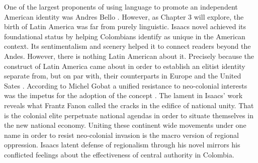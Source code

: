 \documentclass[12pt]{report}\usepackage[]{graphicx}\usepackage[]{color}
\begin{document}
\begin{spacing}{1.9}
One of the largest proponents of using language to promote an independent American identity was Andres Bello \autocite[1350]{Gobat2013}. However, as Chapter 3 will explore, the birth of Latin America was far from purely linguistic. Isaacs novel achieved its foundational status by helping Colombians identify as unique in the American context.  Its sentimentalism and scenery helped it to connect readers beyond the Andes. However, there is nothing Latin American about it. Precisely because the construct of Latin America came about in order to establish an elitist identity separate from, but on par with, their counterparts in Europe and the United Sates \autocite[1349]{Gobat2013}. According to Michel Gobat a unified resistance to neo-colonial interests was the impetus for the adoption of the concept \autocite[1349]{Gobat2013}. The lament in Isaacs' work reveals what Frantz Fanon called the cracks in the edifice of national unity. That is the colonial elite perpetuate national agendas in order to situate themselves in the new national economy. Uniting these continent wide movements under one name in order to resist neo-colonial invasion is the macro version of regional oppression. Isaacs latent defense of regionalism through his novel mirrors his conflicted feelings about the effectiveness of central authority in Colombia. 








\makeworkscited
\end{spacing}
\end{document}
